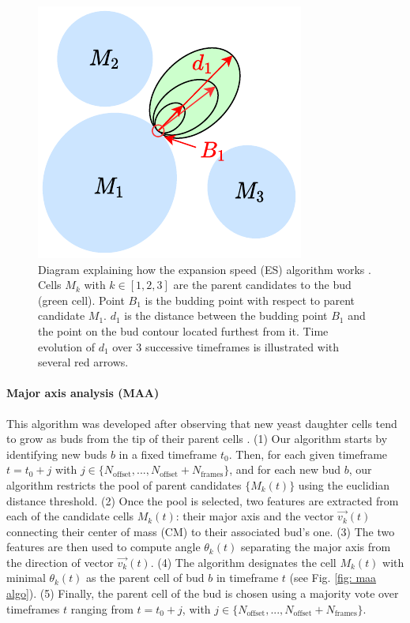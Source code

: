 \documentclass{TP}
\begin{document}
\begin{figure}[h]
\centering
\includegraphics[width=0.7\linewidth]{Schemas et illustrations/es.pdf}
\captionsetup{justification=raggedright}
\caption{ Diagram explaining how the expansion speed (ES) algorithm works . Cells $M_k$ with $k \in [1,2,3]$ are the parent candidates to the bud (green cell). Point $B_1$ is the budding point with respect to parent candidate $M_1$. $d_1$ is the distance between the budding point $B_1$ and the point on the bud contour located furthest from it. Time evolution of $d_1$ over 3 successive timeframes is illustrated with several red arrows.}
\label{fig: expansion speed algo}
\end{figure}

\paragraph{Major axis analysis (MAA)}
This algorithm was developed after observing that new yeast daughter cells tend to grow as buds from the tip of their parent cells \cite{yeaz}. (1) Our algorithm starts by identifying new buds $b$ in a fixed timeframe $t_0$. Then, for each given timeframe $t = t_0 + j$ with $j \in \{N_{\text{offset}},...,N_{\text{offset}} + N_{\text{frames}}\}$, and for each new bud $b$, our algorithm restricts the pool of parent candidates $\{M_k (t)\}$ using the euclidian distance threshold. (2) Once the pool is selected, two features are extracted from each of the candidate cells $M_k (t)$: their major axis and the vector $\vec{v_k} (t)$ connecting their center of mass (CM) to their associated bud's one. (3) The two features are then used to compute angle $\theta_k (t)$ separating the major axis from the direction of vector $\vec{v_k} (t)$. (4) The algorithm designates the cell $M_k(t)$ with minimal $\theta_k(t)$ as the parent cell of bud $b$ in timeframe $t$ (see Fig. \ref{fig: maa algo}). (5) Finally, the parent cell of the bud is chosen using a majority vote over timeframes $t$ ranging from $t = t_0 + j$, with $j \in \{ N_{\text{offset}},...,N_{\text{offset}} + N_{\text{frames}}\}$. 
\end{document}
